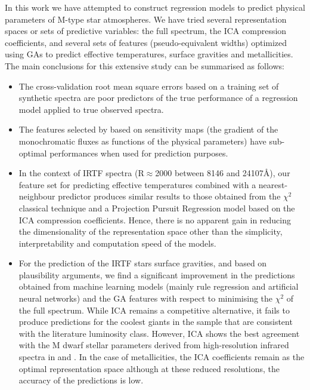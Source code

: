
In this work we have attempted to construct regression models to
predict physical parameters of M-type star atmospheres. We have tried
several representation spaces or sets of predictive variables: the
full spectrum, the ICA compression coefficients, and several sets of
features (pseudo-equivalent widths) optimized using GAs to predict
effective temperatures, surface gravities and metallicities. The main
conclusions for this extensive study can be summarised as follows:
\begin{itemize}

\item The cross-validation root mean square errors based on a training set of synthetic spectra  are poor predictors of the true performance of a regression model applied to true observed spectra.

\item The features selected by \cite{cesetti} based on sensitivity maps (the gradient of the monochromatic fluxes as functions of the physical parameters) have sub-optimal performances when used for prediction purposes.

\item In the context of IRTF spectra (R$\approx$2000 between 8146 and 24107\AA), our feature set for predicting effective temperatures combined with a nearest-neighbour predictor produces similar results to those obtained from the $\chi^2$ classical technique and a Projection Pursuit Regression model based on the ICA compression coefficients. Hence, there is no apparent gain in reducing the dimensionality of the representation space other than the simplicity, interpretability and computation speed of the models.   

\item For the prediction of the IRTF stars surface gravities, and
  based on plausibility arguments, we find a significant improvement
  in the predictions obtained from machine learning models (mainly
  rule regression and artificial neural networks) and the GA features
  with respect to minimising the $\chi^2$ of the full spectrum. While
  ICA remains a competitive alternative, it fails to produce
  predictions for the coolest giants in the sample that are consistent
  with the literature luminosity class. However, ICA shows the best
  agreement with the M dwarf stellar parameters derived from
  high-resolution infrared spectra in \cite{esm1} and \cite{esm2}. In
  the case of metallicities, the ICA coefficients remain as the
  optimal representation space although at these reduced resolutions,
  the accuracy of the predictions is low.


\end{itemize}
